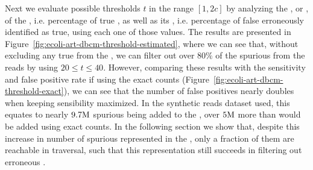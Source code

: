 Next we evaluate possible thresholds $t$ in the range $[1, 2c]$ by analyzing the , or , of the \dBCM, i.e. percentage of true  , as well as its , i.e. percentage of false  erroneously identified as true, using each one of those values. The results are presented in Figure~\ref{fig:ecoli-art-dbcm-threshold-estimated}, where we can see that, without excluding any true  from the \dBG, we can filter out over $80\%$ of the spurious  from the reads by using $20 \leq t \leq 40$. However, comparing these results with the sensitivity and false positive rate if using the exact counts (Figure~\ref{fig:ecoli-art-dbcm-threshold-exact}), we can see that the number of false positives nearly doubles when keeping sensibility maximized. In the synthetic reads dataset used, this equates to nearly $9.7\mega$ spurious  being added to the \dBG, over $5\mega$ more than would be added using exact counts. In the following section we show that, despite this increase in number of spurious  represented in the \dBCM, only a fraction of them are reachable in traversal, such that this representation still succeeds in filtering out erroneous .

